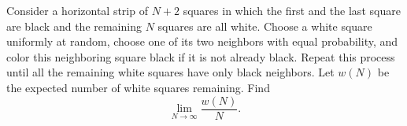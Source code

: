 Consider a horizontal strip of $N+2$ squares in which the first and the last square are black and the remaining $N$ squares are all white. Choose a white square uniformly at random, choose one of its two neighbors with equal probability,
and color this neighboring square black if it is not already black. Repeat this process until all the remaining white squares have only black neighbors. Let $w(N)$ be the expected number of white squares remaining. Find
\[
\lim_{N \to \infty} \frac{w(N)}{N}.
\]

